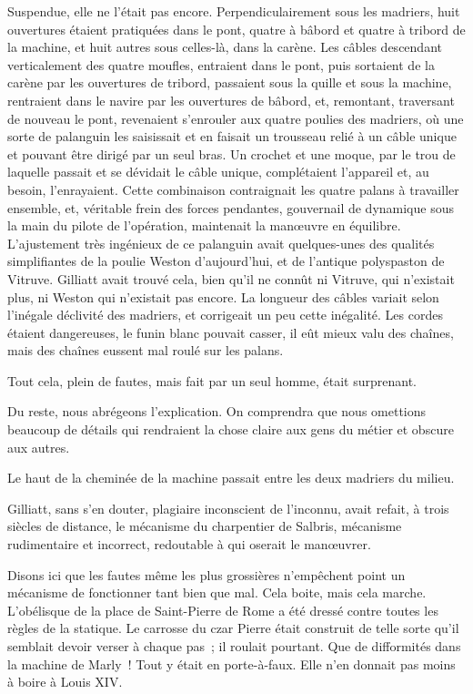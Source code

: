 \documentclass[french,twoside]{book} %
\begin{document}
Suspendue, elle ne l’était pas encore. Perpendiculairement sous les madriers, huit ouvertures étaient pratiquées dans le pont, quatre à bâbord et quatre à tribord de la machine, et huit autres sous celles-là, dans la carène. Les câbles descendant verticalement des quatre moufles, entraient dans le pont, puis sortaient de la carène par les ouvertures de tribord, passaient sous la quille et sous la machine, rentraient dans le navire par les ouvertures de bâbord, et, remontant, traversant de nouveau le pont, revenaient s’enrouler aux quatre poulies des madriers, où une sorte de palanguin les saisissait et en faisait un trousseau relié à un câble unique et pouvant être dirigé par un seul bras. Un crochet et une moque, par le trou de laquelle passait et se dévidait le câble  unique, complétaient l’appareil et, au besoin, l’enrayaient. Cette combinaison contraignait les quatre palans à travailler ensemble, et, véritable frein des forces pendantes, gouvernail de dynamique sous la main du pilote de l’opération, maintenait la manœuvre en équilibre. L’ajustement très ingénieux de ce palanguin avait quelques-unes des qualités simplifiantes de la poulie Weston d’aujourd’hui, et de l’antique polyspaston de Vitruve. Gilliatt avait trouvé cela, bien qu’il ne connût ni Vitruve, qui n’existait plus, ni Weston qui n’existait pas encore. La longueur des câbles variait selon l’inégale déclivité des madriers, et corrigeait un peu cette inégalité. Les cordes étaient dangereuses, le funin blanc pouvait casser, il eût mieux valu des chaînes, mais des chaînes eussent mal roulé sur les palans.\par
Tout cela, plein de fautes, mais fait par un seul homme, était surprenant.\par
Du reste, nous abrégeons l’explication. On comprendra que nous omettions beaucoup de détails qui rendraient la chose claire aux gens du métier et obscure aux autres.\par
Le haut de la cheminée de la machine passait entre les deux madriers du milieu.\par
Gilliatt, sans s’en douter, plagiaire inconscient de l’inconnu, avait refait, à trois siècles de distance, le mécanisme du charpentier de Salbris, mécanisme rudimentaire et incorrect, redoutable à qui oserait le manœuvrer.\par
Disons ici que les fautes même les plus grossières  n’empêchent point un mécanisme de fonctionner tant bien que mal. Cela boite, mais cela marche. L’obélisque de la place de Saint-Pierre de Rome a été dressé contre toutes les règles de la statique. Le carrosse du czar Pierre était construit de telle sorte qu’il semblait devoir verser à chaque pas ; il roulait pourtant. Que de difformités dans la machine de Marly ! Tout y était en porte-à-faux. Elle n’en donnait pas moins à boire à Louis XIV.\par
\end{document}
